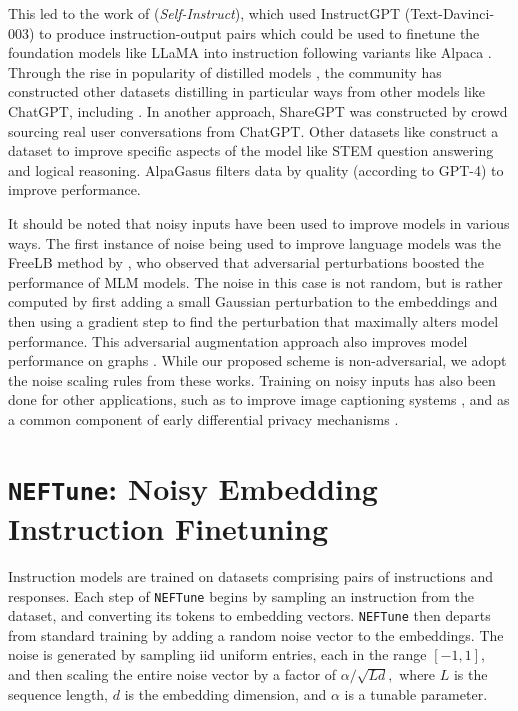 \documentclass{article} %
\newcommand{\neftune}{\texttt{NEFTune}}
\newcommand{\llama}{LLaMA}
\begin{document}
This led to the work of \citet{wang2022selfinstruct} (\textit{Self-Instruct}), which used InstructGPT (Text-Davinci-003) to produce instruction-output pairs which could be used to finetune the foundation models like \llama{} into instruction following variants like Alpaca \citep{alpaca}.  
Through the rise in popularity of distilled models \citet{alpaca}, the community has constructed other datasets distilling in particular ways from other models like ChatGPT, including \citet{xu2023wizardlm}. In another approach, ShareGPT \citep{vicuna2023} was constructed by crowd sourcing real user conversations from ChatGPT. 
Other datasets like \citet{platypus2023} construct a dataset to improve specific aspects of the model like STEM question answering and logical reasoning. AlpaGasus \citep{chen2023alpagasus} filters data by quality (according to GPT-4) to improve performance.

It should be noted that noisy inputs have been used to improve models in various ways. The first instance of noise being used to improve language models was the FreeLB method by \cite{zhu2019freelb}, who observed that adversarial perturbations boosted the performance of MLM models.  The noise in this case is not random, but is rather computed by first adding a small Gaussian perturbation to the embeddings and then using a gradient step to find the perturbation that maximally alters model performance. This adversarial augmentation approach also improves model performance on graphs \cite{kong2022robust}.  While our proposed scheme is non-adversarial, we adopt the noise scaling rules from these works. Training on noisy inputs has also been done for other applications, such as to improve image captioning systems \citep{Nukrai2022TextOnlyTF}, and as a common component of early differential privacy mechanisms \citep{dwork2014algorithmic}.

\section{\neftune{}: Noisy Embedding Instruction Finetuning} \label{sec:NEFT}
 Instruction models are trained on datasets comprising pairs of instructions and responses. Each step of \neftune{} begins by sampling an instruction from the dataset, and converting its tokens to embedding vectors. \neftune{} then departs from standard training by adding a random noise vector to the embeddings. The noise is generated by sampling iid uniform entries, each in the range $[-1,1]$, and then scaling the entire noise vector by a factor of $\alpha/\sqrt{Ld},$ where $L$ is the sequence length, $d$ is the embedding dimension, and $\alpha$ is a tunable parameter. 
\end{document}
